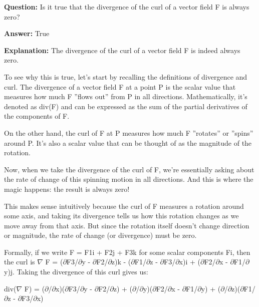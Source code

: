 \documentclass{article}
\begin{document}
                \vspace{0.5cm} 
        
            
                \textbf {Question:} Is it true that the divergence of the curl of a vector field F is always zero?
                
                \textbf{Answer:} True

                \textbf{Explanation:} The divergence of the curl of a vector field F is indeed always zero.

To see why this is true, let's start by recalling the definitions of divergence and curl. The divergence of a vector field F at a point P is the scalar value that measures how much F ''flows out'' from P in all directions. Mathematically, it's denoted as div(F) and can be expressed as the sum of the partial derivatives of the components of F.

On the other hand, the curl of F at P measures how much F ''rotates'' or ''spins'' around P. It's also a scalar value that can be thought of as the magnitude of the rotation.

Now, when we take the divergence of the curl of F, we're essentially asking about the rate of change of this spinning motion in all directions. And this is where the magic happens: the result is always zero!

This makes sense intuitively because the curl of F measures a rotation around some axis, and taking its divergence tells us how this rotation changes as we move away from that axis. But since the rotation itself doesn't change direction or magnitude, the rate of change (or divergence) must be zero.

Formally, if we write F = F1i + F2j + F3k for some scalar components Fi, then the curl is \ensuremath{\nabla} {\texttimes} F = (\ensuremath{\partial}F3/\ensuremath{\partial}y - \ensuremath{\partial}F2/\ensuremath{\partial}z)k - (\ensuremath{\partial}F1/\ensuremath{\partial}z - \ensuremath{\partial}F3/\ensuremath{\partial}x)i + (\ensuremath{\partial}F2/\ensuremath{\partial}x - \ensuremath{\partial}F1/\ensuremath{\partial}y)j. Taking the divergence of this curl gives us:

div(\ensuremath{\nabla} {\texttimes} F) = (\ensuremath{\partial}/\ensuremath{\partial}x)(\ensuremath{\partial}F3/\ensuremath{\partial}y - \ensuremath{\partial}F2/\ensuremath{\partial}z) + (\ensuremath{\partial}/\ensuremath{\partial}y)(\ensuremath{\partial}F2/\ensuremath{\partial}x - \ensuremath{\partial}F1/\ensuremath{\partial}y) + (\ensuremath{\partial}/\ensuremath{\partial}z)(\ensuremath{\partial}F1/\ensuremath{\partial}z - \ensuremath{\partial}F3/\ensuremath{\partial}x)
\end{document}
